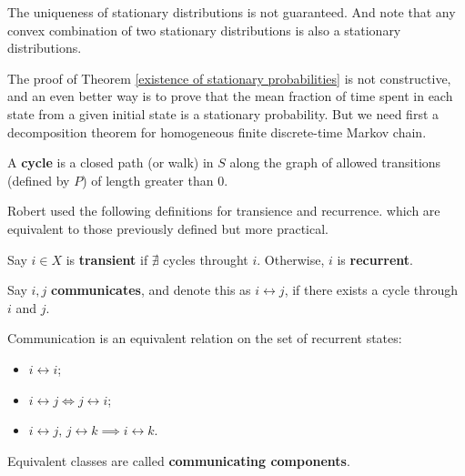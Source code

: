 \begin{remark}
    The uniqueness of stationary distributions is not guaranteed. And note that any convex combination of two stationary distributions is also a stationary distributions.
\end{remark}

The proof of Theorem \ref{existence of stationary probabilities} is not constructive, and an even better way is to prove that the mean fraction of time spent in each state from a given initial state is a stationary probability. But we need first a decomposition theorem for homogeneous finite discrete-time Markov chain. 

\begin{definition}[Cycles]
    A \textbf{cycle} is a closed path (or walk) in $S$ along the graph of allowed transitions (defined by $P$) of length greater than $0$.
\end{definition}

Robert used the following definitions for transience and recurrence. which are equivalent to those previously defined but more practical.
\begin{definition}
    Say $i \in X$ is \textbf{transient} if $\nexists$ cycles throught $i$. Otherwise, $i$ is \textbf{recurrent}.
\end{definition}

\begin{definition}[Communication]
    Say $i,j$ \textbf{communicates}, and denote this as $i \leftrightarrow j$, if there exists a cycle through $i$ and $j$.
\end{definition}

\begin{proposition}
    Communication is an equivalent relation on the set of recurrent states:
    \begin{itemize}
        \item $i \leftrightarrow i$;
        \item $i \leftrightarrow j \iff j \leftrightarrow i$;
        \item $i \leftrightarrow j,\, j \leftrightarrow k \implies i \leftrightarrow k$.
    \end{itemize}
\end{proposition}

\begin{definition}
    Equivalent classes are called \textbf{communicating components}.
\end{definition}

